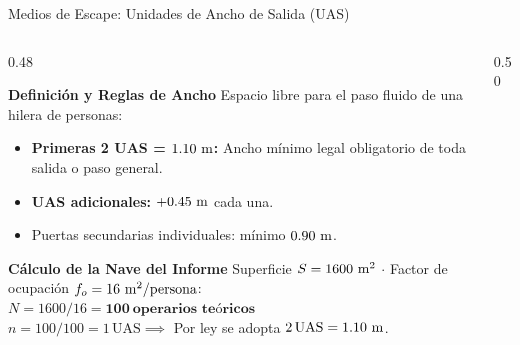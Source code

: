 \begin{frame}{Medios de Escape: Unidades de Ancho de Salida (UAS)}
  \begin{columns}[c]
    \begin{column}{0.48\textwidth}
      \begin{block}{\textbf{Definición y Reglas de Ancho}}
        \small
        Espacio libre para el paso fluido de una hilera de personas:
        \vspace{0.05cm}
        \begin{itemize}
          \footnotesize
          \setlength{\itemsep}{3pt}
          \item \textbf{Primeras 2 UAS = $1.10\,\,\mathrm{m}$:} Ancho mínimo legal obligatorio de toda salida o paso general.
          \item \textbf{UAS adicionales:} $+0.45\,\,\mathrm{m}$ cada una.
          \item Puertas secundarias individuales: mínimo $0.90\,\,\mathrm{m}$.
        \end{itemize}
      \end{block}
      \vspace{0.15cm}
      \begin{exampleblock}{\textbf{Cálculo de la Nave del Informe}}
        \footnotesize
        Superficie $S = 1600\,\,\mathrm{m}^2$ $\cdot$ Factor de ocupación $f_o = 16\,\,\mathrm{m}^2/\text{persona}$:\\
        $N = 1600 / 16 = \mathbf{100\ \text{operarios teóricos}}$\\[3pt]
        $n = 100 / 100 = 1\,\mathrm{UAS} \implies$ Por ley se adopta \textbf{$2\,\mathrm{UAS} = 1.10\,\,\mathrm{m}$}.
      \end{exampleblock}
    \end{column}

    \begin{column}{0.50\textwidth}
      \centering
\end{column}
\end{columns}
\end{frame}
